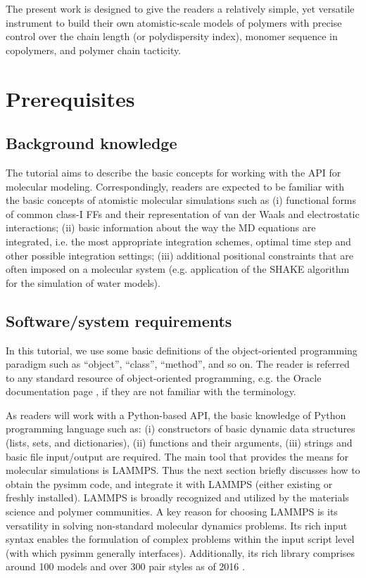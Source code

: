 \documentclass[9pt,tutorial]{livecoms}
\begin{document}
The present work is designed to give the readers a relatively simple, yet versatile instrument to build their own atomistic-scale models of polymers with precise control over the chain length (or polydispersity index), monomer sequence in copolymers, and polymer chain tacticity. 


\section{Prerequisites}

\subsection{Background knowledge}

The tutorial aims to describe the basic concepts for working with the API for molecular modeling. Correspondingly, readers are expected to be familiar with the basic concepts of atomistic molecular simulations such as (i) functional forms of common class-I FFs and their representation of van der Waals and electrostatic interactions; (ii) basic information about the way the MD equations are integrated, i.e. the most appropriate integration schemes, optimal time step and other possible integration settings; (iii) additional positional constraints that are often imposed on a molecular system (e.g. application of the SHAKE algorithm for the simulation of water models).

\subsection{Software/system requirements}
In this tutorial, we use some basic definitions of the object-oriented programming paradigm such as “object”, “class”, “method”, and so on. The reader is referred to any standard resource of object-oriented programming, e.g. the Oracle documentation page \cite{sun_oop_summary}, if they are not familiar with the terminology.

As readers will work with a Python-based API, the basic knowledge of Python programming language such as: (i) constructors of basic dynamic data structures (lists, sets, and dictionaries), (ii) functions and their arguments, (iii) strings and basic file input/output are required. 
The main tool that provides the means for molecular simulations is LAMMPS. Thus the next section briefly discusses how to obtain the pysimm code, and integrate it with LAMMPS (either existing or freshly installed). 
LAMMPS is broadly recognized and utilized by the materials science and polymer communities. A key reason for choosing LAMMPS is its versatility in solving non-standard molecular dynamics problems. Its rich input syntax enables the formulation of complex problems within the input script level (with which pysimm generally interfaces). Additionally, its rich library comprises around 100 models and over 300 pair styles as of 2016 \cite{lammps_at_osti}.
\end{document}
